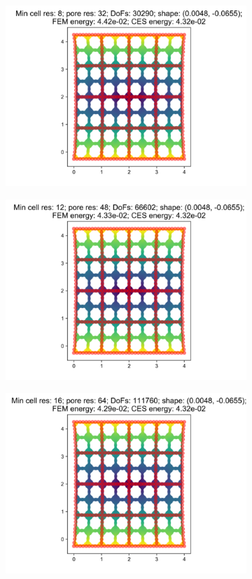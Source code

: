 \begin{figure}[H]
\begin{subfigure}{.45\textwidth}
\end{subfigure}
\begin{subfigure}{.45\textwidth}
  \centering
  \includegraphics[width=.8\linewidth]{lces/vis_tension/bm_3_mesh_3.png}
\end{subfigure}
\newline
\begin{subfigure}{.45\textwidth}
  \centering
  \includegraphics[width=.8\linewidth]{lces/vis_tension/bm_3_mesh_4.png}
\end{subfigure}
\begin{subfigure}{.45\textwidth}
  \centering
  \includegraphics[width=.8\linewidth]{lces/vis_tension/bm_3_mesh_5.png}
\end{subfigure}
\end{figure}

